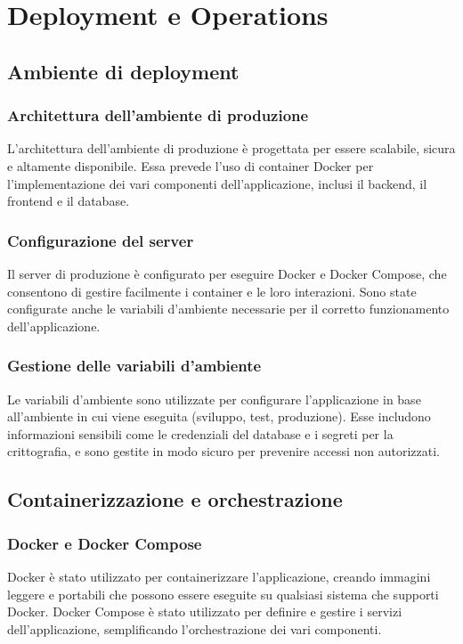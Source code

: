\documentclass[12pt,a4paper,oneside]{report}
\begin{document}
\chapter{Deployment e Operations}
\section{Ambiente di deployment}
\subsection{Architettura dell'ambiente di produzione}
L'architettura dell'ambiente di produzione è progettata per essere scalabile, sicura e altamente disponibile. Essa prevede l'uso di container Docker per l'implementazione dei vari componenti dell'applicazione, inclusi il backend, il frontend e il database.

\subsection{Configurazione del server}
Il server di produzione è configurato per eseguire Docker e Docker Compose, che consentono di gestire facilmente i container e le loro interazioni. Sono state configurate anche le variabili d'ambiente necessarie per il corretto funzionamento dell'applicazione.

\subsection{Gestione delle variabili d'ambiente}
Le variabili d'ambiente sono utilizzate per configurare l'applicazione in base all'ambiente in cui viene eseguita (sviluppo, test, produzione). Esse includono informazioni sensibili come le credenziali del database e i segreti per la crittografia, e sono gestite in modo sicuro per prevenire accessi non autorizzati.

\section{Containerizzazione e orchestrazione}
\subsection{Docker e Docker Compose}
Docker è stato utilizzato per containerizzare l'applicazione, creando immagini leggere e portabili che possono essere eseguite su qualsiasi sistema che supporti Docker. Docker Compose è stato utilizzato per definire e gestire i servizi dell'applicazione, semplificando l'orchestrazione dei vari componenti.
\end{document}
